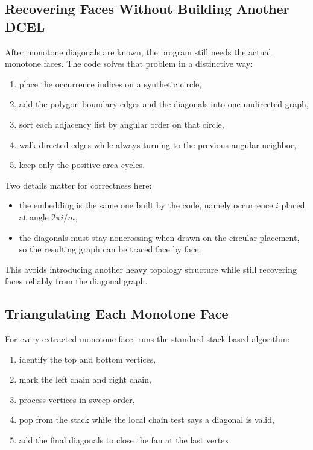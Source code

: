 \documentclass[11pt]{article}
\DeclareRobustCommand{\code}[1]{\texttt{\detokenize{#1}}}
\begin{document}
\subsection{Recovering Faces Without Building Another DCEL}

After monotone diagonals are known, the program still needs the actual monotone faces. The code solves that problem in a distinctive way:

\begin{enumerate}
\item place the occurrence indices on a synthetic circle,
\item add the polygon boundary edges and the diagonals into one undirected graph,
\item sort each adjacency list by angular order on that circle,
\item walk directed edges while always turning to the previous angular neighbor,
\item keep only the positive-area cycles.
\end{enumerate}

Two details matter for correctness here:

\begin{itemize}
\item the embedding is the same one built by the code, namely occurrence $i$ placed at angle $2\pi i / m$,
\item the diagonals must stay noncrossing when drawn on the circular placement, so the resulting graph can be traced face by face.
\end{itemize}

This avoids introducing another heavy topology structure while still recovering faces reliably from the diagonal graph.

\subsection{Triangulating Each Monotone Face}

For every extracted monotone face, \code{triangulateMonotoneFace} runs the standard stack-based algorithm:

\begin{enumerate}
\item identify the top and bottom vertices,
\item mark the left chain and right chain,
\item process vertices in sweep order,
\item pop from the stack while the local chain test says a diagonal is valid,
\item add the final diagonals to close the fan at the last vertex.
\end{enumerate}
\end{document}
